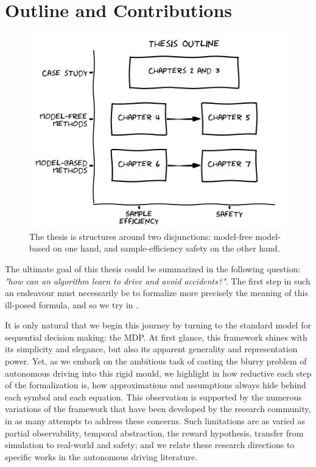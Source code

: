 \section{Outline and Contributions}

\begin{figure}[ht]
	\centering
	\includegraphics[width=0.9\linewidth]{img/outline}
	\caption{The thesis is structures around two disjunctions: model-free \vs model-based on one hand, and sample-efficiency \vs safety on the other hand.}
	\label{fig:thesis-outline}
\end{figure}

The ultimate goal of this thesis could be summarized in the following question: \emph{"how can an algorithm learn to drive and avoid accidents?"}. The first step in such an endeavour must necessarily be to formalize more precisely the meaning of this ill-posed formula, and so we try in .

It is only natural that we begin this journey by turning to the standard model for sequential decision making: the \acl*{MDP}. At first glance, this framework shines with its simplicity and elegance, but also its apparent generality and representation power. Yet, as we embark on the ambitious task of casting the blurry problem of autonomous driving into this rigid mould, we highlight in  how reductive each step of the formalization is, how approximations and assumptions always hide behind each symbol and each equation. This observation is supported by the numerous variations of the framework that have been developed by the research community, in as many attempts to address these concerns. Such limitations are as varied as partial observability, temporal abstraction, the reward hypothesis, transfer from simulation to real-world and safety; and we relate these research directions to specific works in the autonomous driving literature.

